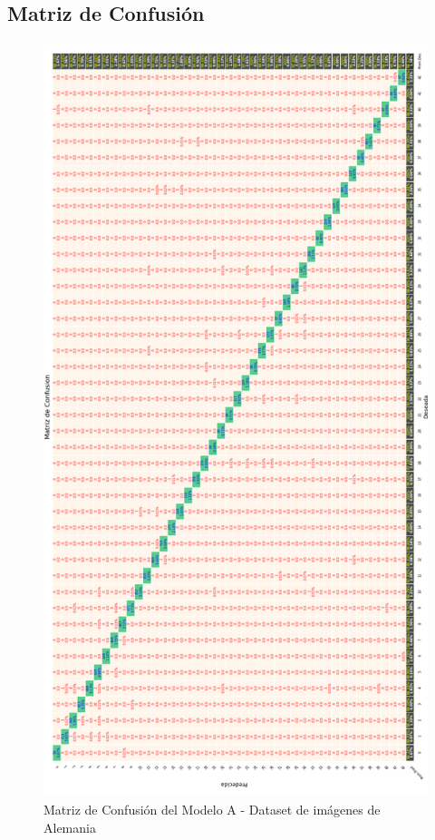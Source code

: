 	 	\subsection{Matriz de Confusión}  
			\begin{figure}[H]
				\begin{center}
				\includegraphics[width=1\textwidth, height=22cm]{images/desarrollo/testResults/german/model_A_A} 
				\end{center}
				\begin{center}
				\caption{\small{Matriz de Confusión del Modelo A - Dataset de imágenes de Alemania}}
				\vspace{-1em}
				{\small{\fontsize{10}{16.8}\selectfont {Fuente propia}}}
				\end{center}
				\vspace{-1.5em}
			\end{figure}
